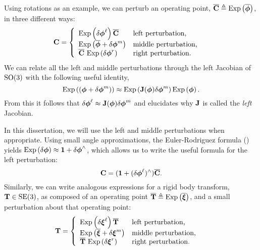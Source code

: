 Using rotations as an example, we can perturb an operating point, $\overline{\boldsymbol{\mathbf{C}}} \triangleq \mathrm{Exp}\left({\overline{\boldsymbol{\mathbf{\phi}}}}\right)$, in three different ways:
\begin{align}
\boldsymbol{\mathbf{C}} &= \left\{  	\begin{array}{ll}
		\mathrm{Exp}\left({\delta \boldsymbol{\mathbf{\phi}}^\ell}\right) \overline{\boldsymbol{\mathbf{C}}}   & \mbox{left perturbation,} \\
		\mathrm{Exp}\left({\overline{\boldsymbol{\mathbf{\phi}}} + \delta \boldsymbol{\mathbf{\phi}}^m}\right)  & \mbox{middle perturbation,} \\
		\overline{\boldsymbol{\mathbf{C}}} ~ \mathrm{Exp}\left({\delta \boldsymbol{\mathbf{\phi}}^r}\right)  & \mbox{right perturbation.}  \\
	\end{array}
	\right.
\end{align}
We can relate all the left and middle perturbations through the left Jacobian of $\mathrm{SO}(3)$ with the following useful identity,
\begin{equation}
\mathrm{Exp}\left({( \boldsymbol{\mathbf{\phi}} + \delta \boldsymbol{\mathbf{\phi}}^m)}\right) \approx \mathrm{Exp}\left({\boldsymbol{\mathbf{J}}(\boldsymbol{\mathbf{\phi}}) \delta \boldsymbol{\mathbf{\phi}}^m}\right) \mathrm{Exp}\left({\boldsymbol{\mathbf{\phi}}}\right).	
\end{equation}
From this it follows that $\delta \boldsymbol{\mathbf{\phi}}^\ell \approx \boldsymbol{\mathbf{J}}(\boldsymbol{\mathbf{\phi}}) \delta \boldsymbol{\mathbf{\phi}}^m$ and elucidates why $\boldsymbol{\mathbf{J}}$ is called the \textit{left} Jacobian. 

In this dissertation, we will use the left and middle perturbations when appropriate. Using small angle approximations, the Euler-Rodriguez formula () yields $\mathrm{Exp}\left({\delta \boldsymbol{\mathbf{\phi}}}\right) \approx \boldsymbol{\mathbf{1}} + \delta \boldsymbol{\mathbf{\phi}}^\wedge$, which allows us to write the useful formula for the left perturbation:
\begin{equation}
	\boldsymbol{\mathbf{C}} = (\boldsymbol{\mathbf{1}} + (\delta \boldsymbol{\mathbf{\phi}}^\ell)^\wedge) \overline{\boldsymbol{\mathbf{C}}}.
\end{equation}
Similarly, we can write analogous expressions for a rigid body transform, $\boldsymbol{\mathbf{T}} \in \mathrm{SE}(3)$, as composed of an operating point $\overline{\boldsymbol{\mathbf{T}}} \triangleq \mathrm{Exp}\left({\overline{\boldsymbol{\mathbf{\xi}}}}\right)$, and a small perturbation about that operating point:
\begin{align}
\boldsymbol{\mathbf{T}} &= \left\{  	\begin{array}{ll}
		\mathrm{Exp}\left({\delta \boldsymbol{\mathbf{\xi}}^\ell}\right) \overline{\boldsymbol{\mathbf{T}}}   & \mbox{left perturbation,} \\
		\mathrm{Exp}\left({\overline{\boldsymbol{\mathbf{\xi}}} + \delta \boldsymbol{\mathbf{\xi}}^m}\right)  & \mbox{middle perturbation,} \\
		\overline{\boldsymbol{\mathbf{T}}} ~ \mathrm{Exp}\left({\delta \boldsymbol{\mathbf{\xi}}^r}\right)  & \mbox{right perturbation.}  \\
	\end{array}
	\right.
\end{align}

